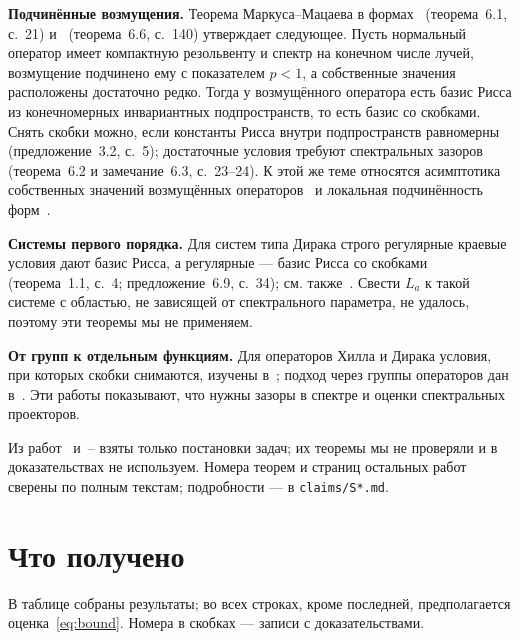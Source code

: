 \documentclass[12pt,a4paper]{article}
\begin{document}
\textbf{Подчинённые возмущения.} Теорема Маркуса--Мацаева в формах~\cite{S4}
(теорема~6.1, с.~21) и~\cite{S3} (теорема~6.6, с.~140) утверждает следующее. Пусть
нормальный оператор имеет компактную резольвенту и спектр на конечном числе лучей,
возмущение подчинено ему с показателем $p<1$, а собственные значения расположены
достаточно редко. Тогда у возмущённого оператора есть базис Рисса из конечномерных
инвариантных подпространств, то есть базис со скобками. Снять скобки можно, если
константы Рисса внутри подпространств равномерны~\cite{S4} (предложение~3.2, с.~5);
достаточные условия требуют спектральных зазоров~\cite{S4} (теорема~6.2 и замечание~6.3,
с.~23--24). К этой же теме относятся асимптотика собственных значений возмущённых
операторов~\cite{S20} и локальная подчинённость форм~\cite{S11,S12}.

\textbf{Системы первого порядка.} Для систем типа Дирака строго регулярные краевые
условия дают базис Рисса, а регулярные --- базис Рисса со скобками~\cite{S8}
(теорема~1.1, с.~4; предложение~6.9, с.~34); см. также~\cite{S7,S9,S10}. Свести $L_a$ к
такой системе с областью, не зависящей от спектрального параметра, не удалось, поэтому
эти теоремы мы не применяем.

\textbf{От групп к отдельным функциям.} Для операторов Хилла и Дирака условия, при
которых скобки снимаются, изучены в~\cite{S13,S14,S15,S16,S17,S18,S21}; подход через
группы операторов дан в~\cite{S19}. Эти работы показывают, что нужны зазоры в спектре и
оценки спектральных проекторов.

Из работ~\cite{S7} и~\cite{S9}--\cite{S21} взяты только постановки задач; их теоремы мы не
проверяли и в доказательствах не используем. Номера теорем и страниц остальных работ
сверены по полным текстам; подробности --- в \texttt{claims/S*.md}.

\section{Что получено}
В таблице собраны результаты; во всех строках, кроме последней, предполагается
оценка~\eqref{eq:bound}. Номера в скобках --- записи с доказательствами.
\end{document}
